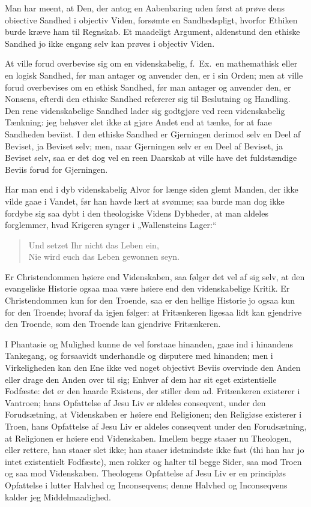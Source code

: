\documentclass[12pt,a4paper]{book}
\newcommand{\opage}[1]{\marginnote{\footnotesize\textit{[#1]}}}
\begin{document}
\opage{90} Man har meent, at Den, der antog en Aabenbaring uden først at prøve dens
obiective Sandhed i objectiv Viden, forsømte en Sandhedspligt, hvorfor
Ethiken burde kræve ham til Regnskab. Et maadeligt Argument, aldenstund
den ethiske Sandhed jo ikke engang selv kan prøves i objectiv Viden.

At ville forud overbevise sig om en videnskabelig, f.\ Ex.\ en
mathemathisk eller en logisk Sandhed, før man antager og anvender den, er
i sin Orden; men at ville forud overbevises om en ethisk Sandhed, før man
antager og anvender den, er Nonsens, efterdi den ethiske Sandhed
refererer sig til Beslutning og Handling. Den rene videnskabelige
Sandhed lader sig godtgjøre ved reen videnskabelig Tænkning: jeg behøver
slet ikke at gjøre Andet end at tænke, for at faae Sandheden beviist. I
den ethiske Sandhed er Gjerningen derimod selv en Deel af Beviset, ja
Beviset selv; men, naar Gjerningen selv er en Deel af Beviset, ja Beviset
selv, saa er det dog vel en reen Daarskab at ville have det fuldstændige
Beviis forud for Gjerningen.

Har man end i dyb videnskabelig Alvor for længe siden glemt Manden, der
ikke vilde gaae i Vandet, før han havde lært at svømme; saa burde man dog
ikke fordybe sig saa dybt i den theologiske Videns Dybheder, at man
aldeles forglemmer, hvad Krigeren synger i „Wallensteins Lager:“

\begin{quote}
Und setzet Ihr nicht das Leben ein,\\
Nie wird euch das Leben gewonnen seyn.
\end{quote}

Er Christendommen høiere end Videnskaben, saa følger det vel af sig selv,
at den evangeliske Historie ogsaa maa være høiere end den videnskabelige
Kritik. Er Christendommen kun for den Troende, saa er den hellige
Historie jo ogsaa kun for den Troende; hvoraf da igjen følger: at
Fritænkeren ligesaa lidt kan gjendrive den Troende, som den Troende kan
gjendrive Fritænkeren.

I Phantasie og Mulighed kunne de vel forstaae hinanden, gaae ind i
hinandens Tankegang, og forsaavidt underhandle og
\opage{91} disputere med hinanden; men i Virkeligheden kan den Ene ikke ved noget
objectivt Beviis overvinde den Anden eller drage den Anden over til sig;
Enhver af dem har sit eget existentielle Fodfæste: det er den haarde
Existens, der stiller dem ad. Fritænkeren existerer i Vantroen; hans
Opfattelse af Jesu Liv er aldeles conseqvent, under den Forudsætning, at
Videnskaben er høiere end Religionen; den Religiøse existerer i Troen,
hans Opfattelse af Jesu Liv er aldeles conseqvent under den
Forudsætning, at Religionen er høiere end Videnskaben. Imellem begge
staaer nu Theologen, eller rettere, han staaer slet ikke; han staaer
idetmindste ikke fast (thi han har jo intet existentielt Fodfæste), men
rokker og halter til begge Sider, saa mod Troen og saa mod Videnskaben.
Theologens Opfattelse af Jesu Liv er en principløs Opfattelse i lutter
Halvhed og Inconseqvens; denne Halvhed og Inconseqvens kalder jeg
Middelmaadighed.
\end{document}
